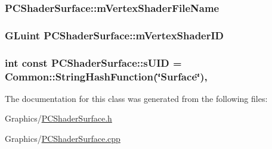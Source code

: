 \subsubsection[{\texorpdfstring{m\+Vertex\+Shader\+File\+Name}{mVertexShaderFileName}}]{ P\+C\+Shader\+Surface\+::m\+Vertex\+Shader\+File\+Name\hspace{0.3cm}{\ttfamily [private]}}\hypertarget{classPCShaderSurface_a6b0d831f9fdea915e3f0a0326e8dbf88}{}\label{classPCShaderSurface_a6b0d831f9fdea915e3f0a0326e8dbf88}
\subsubsection[{\texorpdfstring{m\+Vertex\+Shader\+ID}{mVertexShaderID}}]{\setlength{\rightskip}{0pt plus 5cm}G\+Luint P\+C\+Shader\+Surface\+::m\+Vertex\+Shader\+ID\hspace{0.3cm}{\ttfamily [private]}}\hypertarget{classPCShaderSurface_a8d0fd2eafcceb4765cea47ea67190467}{}\label{classPCShaderSurface_a8d0fd2eafcceb4765cea47ea67190467}
\subsubsection[{\texorpdfstring{s\+U\+ID}{sUID}}]{\setlength{\rightskip}{0pt plus 5cm}int const P\+C\+Shader\+Surface\+::s\+U\+ID = {\bf Common\+::\+String\+Hash\+Function}(\char`\"{}Surface\char`\"{})\hspace{0.3cm}{\ttfamily [static]}, {\ttfamily [private]}}\hypertarget{classPCShaderSurface_a37e06e94768cfb6413e8daa0c8d5a2a2}{}\label{classPCShaderSurface_a37e06e94768cfb6413e8daa0c8d5a2a2}


The documentation for this class was generated from the following files\+:\begin{DoxyCompactItemize}
\item 
Graphics/\hyperlink{PCShaderSurface_8h}{P\+C\+Shader\+Surface.\+h}\item 
Graphics/\hyperlink{PCShaderSurface_8cpp}{P\+C\+Shader\+Surface.\+cpp}\end{DoxyCompactItemize}

